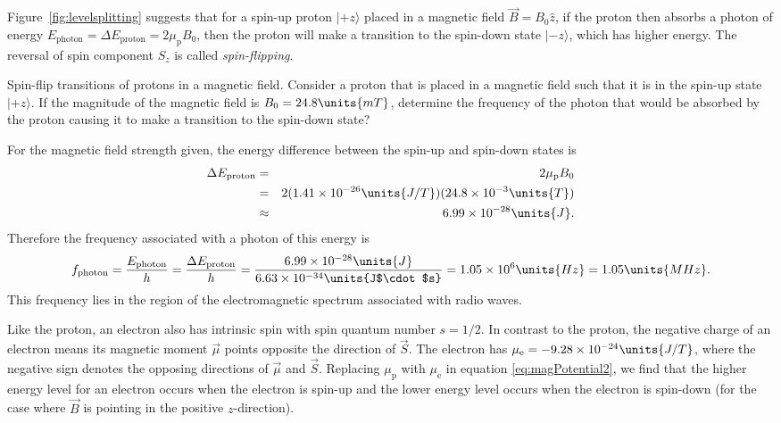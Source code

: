 Figure~\ref{fig:levelsplitting} suggests that for a spin-up proton
$|\mbox{$+z$}\rangle$ placed in a magnetic field $\vec{B} = B_0 \hat{z}$,
if the proton then absorbs a photon of energy 
$E_\text{photon} = \Delta E_\text{proton} =
2 \mu_\text{p} B_0$, then the proton will make a transition to the spin-down
state $|\mbox{$-z$}\rangle$, which has higher energy. 
The reversal of spin component $S_z$ is called {\it spin-flipping}.

\begin{example}{Spin-flip transitions of protons in a magnetic field.} 
\label{example:spinFlip}
Consider a proton that is placed in a magnetic field such that it is in the spin-up state $|\mbox{$+z$}\rangle$. If the magnitude of the magnetic field is $B_0 = 24.8 \units{mT}$, determine the frequency of the photon that would be absorbed by the proton causing it to make a transition to the spin-down state?

\begin{solution}
For the magnetic field strength given, the energy difference between the spin-up and spin-down states is 
\begin{eqnarray}
\Delta E_\text{proton} 
  &=& 2 \mu_\text{p} B_0 \nonumber \\
  &=& 2 (1.41 \times 10^{-26} \units{J/T}) (24.8 \times 10^{-3} \units{T}) 
                              \nonumber \\ 
  &\approx& 6.99 \times 10^{-28} \units{J} .
\end{eqnarray}
Therefore the frequency associated with a photon of this energy is
\begin{equation}
f_\text{photon} = \frac{E_\text{photon}}{h} = \frac{\Delta E_\text{proton}}{h} 
  = \frac{6.99 \times 10^{-28} \units{J}}{6.63 \times 10^{-34} \units{J$\cdot$s}} = 1.05 \times 10^{6} \units{Hz} = 1.05 \units{MHz} . \nonumber
\end{equation}
This frequency lies in the region of the electromagnetic spectrum associated with radio waves.
\end{solution}
\end{example}

Like the proton, an electron also has intrinsic spin with spin quantum 
number $s = 1/2$.  In contrast to the proton, the negative charge of an
electron means its magnetic moment $\vec{\mu}$ points opposite the 
direction of $\vec{S}$.  The electron has
$\mu_\text{e} = -9.28 \times 10^{-24} \units{J/T}$, where the negative sign
 denotes the opposing directions of $\vec{\mu}$ and $\vec{S}$.   
Replacing $\mu_\text{p}$ with $\mu_\text{e}$ in equation \ref{eq:magPotential2},
 we find that the higher energy level for an electron occurs when the electron is spin-up and the lower energy level occurs when the electron is spin-down (for the case where $\vec{B}$ is pointing in the positive $z$-direction). 

